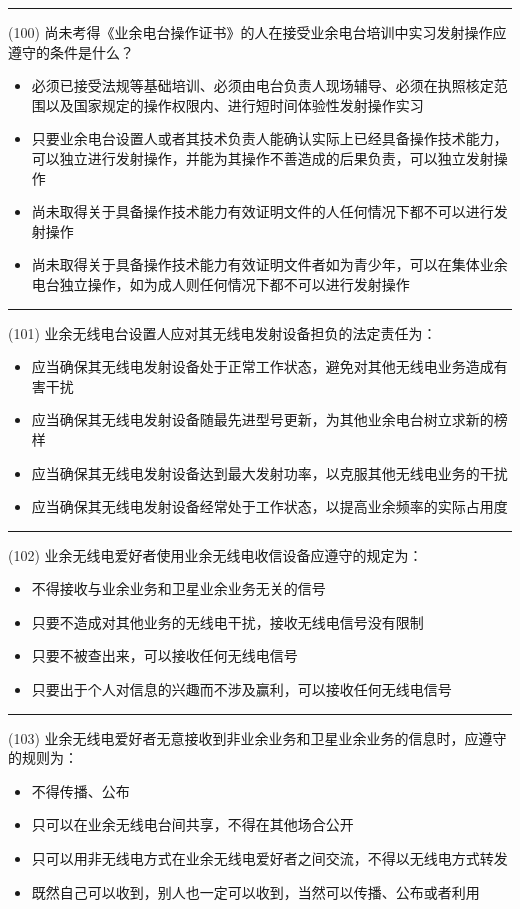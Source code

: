 \documentclass[twocolumn]{ctexart}  %
\begin{document}
\noindent\rule{0.5\textwidth}{1pt}
\heiti (100) 尚未考得《业余电台操作证书》的人在接受业余电台培训中实习发射操作应遵守的条件是什么？ \songti {\color{gray} [LK0064] }
\begin{itemize}
	\item  必须已接受法规等基础培训、必须由电台负责人现场辅导、必须在执照核定范围以及国家规定的操作权限内、进行短时间体验性发射操作实习
	\item  只要业余电台设置人或者其技术负责人能确认实际上已经具备操作技术能力，可以独立进行发射操作，并能为其操作不善造成的后果负责，可以独立发射操作
	\item  尚未取得关于具备操作技术能力有效证明文件的人任何情况下都不可以进行发射操作
	\item  尚未取得关于具备操作技术能力有效证明文件者如为青少年，可以在集体业余电台独立操作，如为成人则任何情况下都不可以进行发射操作
\end{itemize}


\noindent\rule{0.5\textwidth}{1pt}
\heiti (101) 业余无线电台设置人应对其无线电发射设备担负的法定责任为： \songti {\color{gray} [LK0065] }
\begin{itemize}
	\item  应当确保其无线电发射设备处于正常工作状态，避免对其他无线电业务造成有害干扰
	\item  应当确保其无线电发射设备随最先进型号更新，为其他业余电台树立求新的榜样
	\item  应当确保其无线电发射设备达到最大发射功率，以克服其他无线电业务的干扰
	\item  应当确保其无线电发射设备经常处于工作状态，以提高业余频率的实际占用度
\end{itemize}


\noindent\rule{0.5\textwidth}{1pt}
\heiti (102) 业余无线电爱好者使用业余无线电收信设备应遵守的规定为： \songti {\color{gray} [LK0066] }
\begin{itemize}
	\item  不得接收与业余业务和卫星业余业务无关的信号
	\item  只要不造成对其他业务的无线电干扰，接收无线电信号没有限制
	\item  只要不被查出来，可以接收任何无线电信号
	\item  只要出于个人对信息的兴趣而不涉及赢利，可以接收任何无线电信号
\end{itemize}


\noindent\rule{0.5\textwidth}{1pt}
\heiti (103) 业余无线电爱好者无意接收到非业余业务和卫星业余业务的信息时，应遵守的规则为： \songti {\color{gray} [LK0067] }
\begin{itemize}
	\item  不得传播、公布
	\item  只可以在业余无线电台间共享，不得在其他场合公开
	\item  只可以用非无线电方式在业余无线电爱好者之间交流，不得以无线电方式转发
	\item  既然自己可以收到，别人也一定可以收到，当然可以传播、公布或者利用
\end{itemize}
\end{document}
